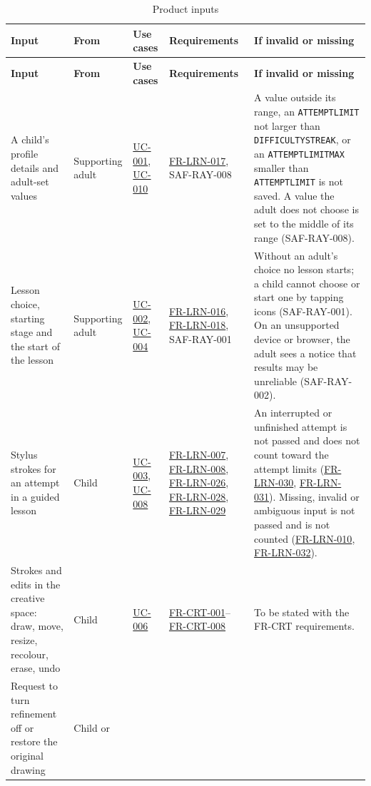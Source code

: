 \documentclass[12pt]{article}
\renewcommand{\_}{\textunderscore\allowbreak}%
\newcommand{\ucref}[1]{\hyperref[uc:#1]{\mbox{UC-#1}}}
\newcommand{\reqref}[1]{\hyperref[req:#1]{#1}}
\providecommand{\ucref}[1]{\hyperref[uc:#1]{UC-#1}}
\begin{document}
{\footnotesize
\setlength{\tabcolsep}{4pt}
\begin{longtable}{@{}
  >{\raggedright\arraybackslash}p{}
  >{\raggedright\arraybackslash}p{}
  >{\raggedright\arraybackslash}p{}
  >{\raggedright\arraybackslash}p{}
  >{\raggedright\arraybackslash}p{}@{}} \caption{Product
  inputs}\label{tab:product-inputs}\\
\toprule
\textbf{Input} & \textbf{From} & \textbf{Use cases} & \textbf{Requirements} &
\textbf{If invalid or missing} \\
\midrule
\endfirsthead
\toprule
\textbf{Input} & \textbf{From} & \textbf{Use cases} & \textbf{Requirements} &
\textbf{If invalid or missing} \\
\midrule
\endhead
\bottomrule
\endlastfoot
A child's profile details and adult-set values & Supporting adult & \ucref{001},
\ucref{010} & \mbox{\reqref{FR-LRN-017}}, SAF-RAY-008 & A value outside its
range, an \texttt{ATTEMPT\_LIMIT} not larger than \texttt{DIFFICULTY\_STREAK},
or an \texttt{ATTEMPT\_LIMIT\_MAX} smaller than \texttt{ATTEMPT\_LIMIT} is not
saved. A value the adult does not choose is set to the middle of its range
(SAF-RAY-008). \\
\addlinespace
Lesson choice, starting stage and the start of the lesson & Supporting adult &
\ucref{002}, \ucref{004} & \mbox{\reqref{FR-LRN-016}},
\mbox{\reqref{FR-LRN-018}}, SAF-RAY-001 & Without an adult's choice no lesson
starts; a child cannot choose or start one by tapping icons (SAF-RAY-001). On an
unsupported device or browser, the adult sees a notice that results may be
unreliable (SAF-RAY-002). \\
\addlinespace
Stylus strokes for an attempt in a guided lesson & Child & \ucref{003},
\ucref{008} & \mbox{\reqref{FR-LRN-007}}, \mbox{\reqref{FR-LRN-008}}, \mbox{\reqref{FR-LRN-026}}, \mbox{\reqref{FR-LRN-028}}, \mbox{\reqref{FR-LRN-029}} & An
interrupted or unfinished attempt is not passed and does not count toward the
attempt limits (\mbox{\reqref{FR-LRN-030}}, \mbox{\reqref{FR-LRN-031}}). Missing, invalid or ambiguous input
is not passed and is not counted (\mbox{\reqref{FR-LRN-010}}, \mbox{\reqref{FR-LRN-032}}). \\
\addlinespace
Strokes and edits in the creative space: draw, move, resize, recolour, erase,
undo & Child & \ucref{006} & \reqref{FR-CRT-001}--\reqref{FR-CRT-008} & To be
stated with the FR-CRT requirements. \\
\addlinespace
Request to turn refinement off or restore the original drawing & Child or

\end{longtable}}
\end{document}

